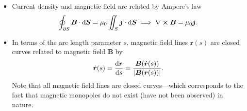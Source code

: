 \documentclass[11pt, a4paper]{article}
\newcommand{\diff}{\mathop{}\!\mathrm{d}} %
\renewcommand{\vec}[1]{\bm{#1}} %
\renewcommand{\r}{\vec{r}}
\newcommand{\B}{\vec{B}} %
\newcommand{\mm}{\mu_{0}}  %
\renewcommand{\j}{\vec{j}}  %
\renewcommand{\curl}{\nabla \cross}
\begin{document}
\begin{itemize}
    \item Current density and magnetic field are related by Ampere's law
    \begin{equation*}
        \oint_{\partial S} \B \cdot \diff \vec{S} = \mm \iint_{S} \j \cdot \diff \vec{S} \implies \curl \B = \mm \j.
    \end{equation*}
    
    \item In terms of the arc length parameter $ s $, magnetic field lines $ \r(s) $ are closed curves related to magnetic field $ \B $ by
	\begin{equation*}
		\dot{\r}(s) = \dv{\r}{s} = \frac{\B(\dot{\r}(s))}{\abs{\B(\r(s))}}.
	\end{equation*}
    Note that all magnetic field lines are closed curves---which corresponds to the fact that magnetic monopoles do not exist (have not been observed) in nature.
    
\end{itemize}
\end{document}
